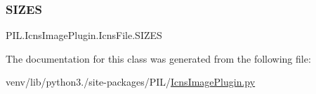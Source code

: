 \subsubsection{\texorpdfstring{S\+I\+Z\+ES}{SIZES}}
{\footnotesize\ttfamily P\+I\+L.\+Icns\+Image\+Plugin.\+Icns\+File.\+S\+I\+Z\+ES\hspace{0.3cm}{\ttfamily [static]}}



The documentation for this class was generated from the following file\+:\begin{DoxyCompactItemize}
\item 
venv/lib/python3./site-\/packages/\+P\+I\+L/\hyperlink{IcnsImagePlugin_8py}{Icns\+Image\+Plugin.\+py}\end{DoxyCompactItemize}
